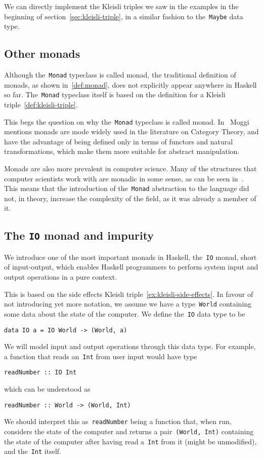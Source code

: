 \documentclass[../TFG.tex]{subfiles}
\begin{document}
We can directly implement the Kleisli triples we saw in the examples in the
beginning of section~\ref{sec:kleisli-triple}, in a similar fashion to
the~\texttt{Maybe} data type.

\subsection{Other monads}
Although the~\texttt{Monad} typeclass is called monad, the
traditional definition of monads, as shown in~\ref{def:monad}, does not
explicitly appear anywhere in Haskell so far. The~\texttt{Monad}
typeclass itself is based on the definition for a Kleisli
triple~\ref{def:kleisli-triple}.

This begs the question on why the~\texttt{Monad} typeclass is
called monad. In~\cite{Moggi-notions-computation-monads} Moggi mentions monads
are mode widely used in the literature on Category Theory, and have the
advantage of being defined only in terms of functors and natural
transformations, which make them more suitable for abstract manipulation.

Monads are also more prevalent in computer science. Many of the structures that
computer scientists work with are monadic in some sense, as can be seen
in~\cite{hackage-monad}. This means that the introduction of
the~\texttt{Monad} abstraction to the language did not, in theory,
increase the complexity of the field, as it was already a member of it.

\subsection{The \texorpdfstring{\texttt{IO}}{IO} monad and impurity}
We introduce one of the most important monads in Haskell,
the~\texttt{IO} monad, short of input-output, which enables Haskell
programmers to perform system input and output operations in a pure context.

This is based on the side effects Kleisli triple~\ref{ex:kleisli-side-effects}.
In favour of not introducing yet more notation, we assume we have a
type~\texttt{World} containing some data about the state of the
computer. We define the~\texttt{IO} data type to be
\begin{verbatim}
data IO a = IO World -> (World, a)
\end{verbatim}
We will model input and output operations through this data type. For example, a
function that reads an~\texttt{Int} from user input would have type
\begin{verbatim}
readNumber :: IO Int
\end{verbatim}
which can be understood as
\begin{verbatim}
readNumber :: World -> (World, Int)
\end{verbatim}
We should interpret this as~\texttt{readNumber} being a function
that, when run, considers the state of the computer and returns a
pair~\texttt{(World, Int)} containing the state of the computer
after having read a~\texttt{Int} from it (might be unmodified),
and the~\texttt{Int} itself.
\end{document}
